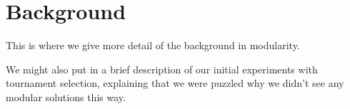 \section{Background}
This is where we give more detail of the background in modularity.

We might also put in a brief description of our initial experiments with tournament selection, explaining that we were puzzled why we didn't see any modular solutions this way.
